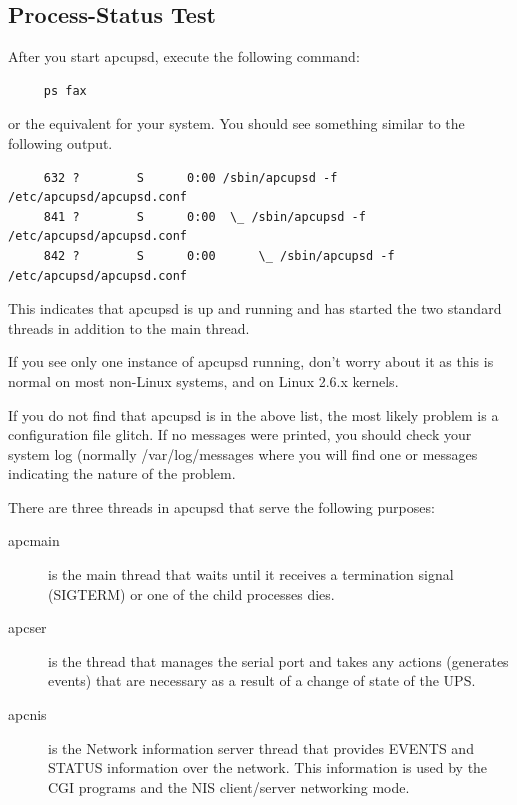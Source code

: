 \subsection*{Process-Status Test}

\label{index-Process-Status-Testing-85}
\label{index-Testing_002c-Process-Status-86}
After you start apcupsd, execute the following command: 

\footnotesize
\begin{verbatim}
     ps fax
\end{verbatim}
\normalsize

or the equivalent for your system. You should see something similar to
the following output. 

\footnotesize
\begin{verbatim}
     632 ?        S      0:00 /sbin/apcupsd -f /etc/apcupsd/apcupsd.conf
     841 ?        S      0:00  \_ /sbin/apcupsd -f /etc/apcupsd/apcupsd.conf
     842 ?        S      0:00      \_ /sbin/apcupsd -f /etc/apcupsd/apcupsd.conf
\end{verbatim}
\normalsize

This indicates that apcupsd is up and running and has started the
two standard threads in addition to the main thread.

If you see only one instance of apcupsd running, don't worry about it as this
is normal on most non-Linux systems, and on Linux 2.6.x kernels.  

If you do not find that apcupsd is in the above list, the most likely problem
is a configuration file glitch.  If no messages were printed, you should check
your system log (normally /var/log/messages where you will find one or
messages indicating the nature of the problem. 

There are three threads in apcupsd that serve the following purposes:

\begin{description}

\item [apcmain]
   is the main thread that waits until it receives a termination signal
(SIGTERM) or one of the child processes dies.  

\item [apcser]
   is the thread that manages the serial port and takes any actions (generates
events) that are necessary as a result of a change of state of the UPS.  

\item [apcnis]
   is the Network information server thread that provides EVENTS and STATUS
information over the network. This information is used by the CGI programs
and the NIS client/server networking mode. 
\end{description}


